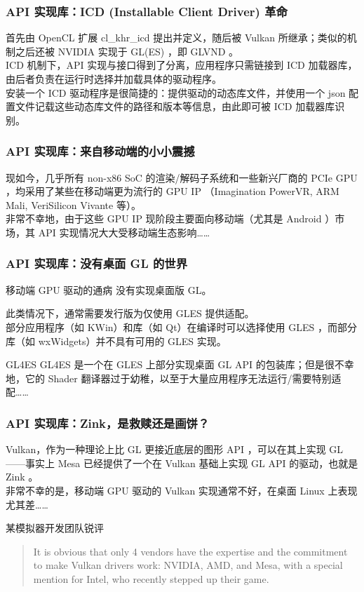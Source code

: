 \documentclass{ctexbeamer}
\begin{document}
\begin{frame}
    \frametitle{API 实现库：ICD (Installable Client Driver) 革命}
    首先由 OpenCL 扩展 cl\_khr\_icd 提出并定义，随后被 Vulkan 所继承；类似的机制之后还被 NVIDIA 实现于 GL(ES) ，即 GLVND 。\\
    ICD 机制下，API 实现与接口得到了分离，应用程序只需链接到 ICD 加载器库，由后者负责在运行时选择并加载具体的驱动程序。\\
    安装一个 ICD 驱动程序是很简捷的：提供驱动的动态库文件，并使用一个 json 配置文件记载这些动态库文件的路径和版本等信息，由此即可被 ICD 加载器库识别。
\end{frame}

\begin{frame}
    \frametitle{API 实现库：来自移动端的小小震撼}
    现如今，几乎所有 non-x86 SoC 的渲染/解码子系统和一些新兴厂商的 PCIe GPU ，均采用了某些在移动端更为流行的 GPU IP （Imagination PowerVR, ARM Mali, VeriSilicon Vivante 等）。\\
    非常不幸地，由于这些 GPU IP 现阶段主要面向移动端（尤其是 Android ）市场，其 API 实现情况大大受移动端生态影响……
\end{frame}

\begin{frame}
    \frametitle{API 实现库：没有桌面 GL 的世界}
    \begin{block}{移动端 GPU 驱动的通病}
        没有实现桌面版 GL。
    \end{block}
    此类情况下，通常需要发行版为仅使用 GLES 提供适配。 \\
    部分应用程序（如 KWin）和库（如 Qt）在编译时可以选择使用 GLES ，而部分库（如 wxWidgets）并不具有可用的 GLES 实现。\\
    \begin{block}{GL4ES}
        GL4ES 是一个在 GLES 上部分实现桌面 GL API 的包装库；但是很不幸地，它的 Shader 翻译器过于幼稚，以至于大量应用程序无法运行/需要特别适配……
    \end{block}
\end{frame}

\begin{frame}
    \frametitle{API 实现库：Zink，是救赎还是画饼？}
    Vulkan，作为一种理论上比 GL 更接近底层的图形 API ，可以在其上实现 GL ——事实上 Mesa 已经提供了一个在 Vulkan 基础上实现 GL API 的驱动，也就是 Zink 。\\
    非常不幸的是，移动端 GPU 驱动的 Vulkan 实现通常不好，在桌面 Linux 上表现尤其差……\\
    \begin{block}{某模拟器开发团队锐评}
        \begin{quote}
            It is obvious that only 4 vendors have the expertise and the commitment to make Vulkan drivers work: NVIDIA, AMD, and Mesa, with a special mention for Intel, who recently stepped up their game.
        \end{quote}
    \end{block}
\end{frame}
\end{document}
